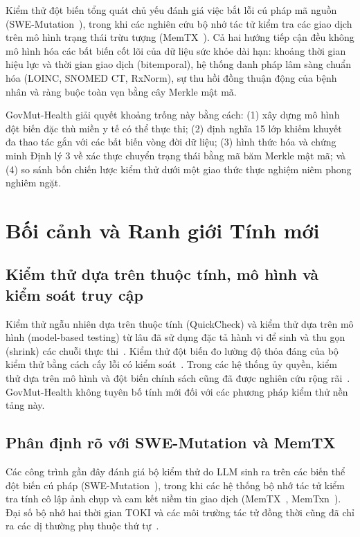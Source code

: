 \documentclass[11pt]{article}
\begin{document}
Kiểm thử đột biến tổng quát chủ yếu đánh giá việc bắt lỗi cú pháp mã nguồn (SWE-Mutation~\cite{swemutation}), trong khi các nghiên cứu bộ nhớ tác tử kiểm tra các giao dịch trên mô hình trạng thái trừu tượng (MemTX~\cite{memtx}). Cả hai hướng tiếp cận đều không mô hình hóa các bất biến cốt lõi của dữ liệu sức khỏe dài hạn: khoảng thời gian hiệu lực và thời gian giao dịch (bitemporal), hệ thống danh pháp lâm sàng chuẩn hóa (LOINC, SNOMED CT, RxNorm), sự thu hồi đồng thuận động của bệnh nhân và ràng buộc toàn vẹn bằng cây Merkle mật mã.

GovMut-Health giải quyết khoảng trống này bằng cách: (1) xây dựng mô hình đột biến đặc thù miền y tế có thể thực thi; (2) định nghĩa 15 lớp khiếm khuyết đa thao tác gắn với các bất biến vòng đời dữ liệu; (3) hình thức hóa và chứng minh Định lý 3 về xác thực chuyển trạng thái bằng mã băm Merkle mật mã; và (4) so sánh bốn chiến lược kiểm thử dưới một giao thức thực nghiệm niêm phong nghiêm ngặt.

\section{Bối cảnh và Ranh giới Tính mới}
\subsection{Kiểm thử dựa trên thuộc tính, mô hình và kiểm soát truy cập}
Kiểm thử ngẫu nhiên dựa trên thuộc tính (QuickCheck) và kiểm thử dựa trên mô hình (model-based testing) từ lâu đã sử dụng đặc tả hành vi để sinh và thu gọn (shrink) các chuỗi thực thi~\cite{quickcheck,utting}. Kiểm thử đột biến đo lường độ thỏa đáng của bộ kiểm thử bằng cách cấy lỗi có kiểm soát~\cite{jia}. Trong các hệ thống ủy quyền, kiểm thử dựa trên mô hình và đột biến chính sách cũng đã được nghiên cứu rộng rãi~\cite{pretschner2008,xu2012,nist800192}. GovMut-Health không tuyên bố tính mới đối với các phương pháp kiểm thử nền tảng này.

\subsection{Phân định rõ với SWE-Mutation và MemTX}
Các công trình gần đây đánh giá bộ kiểm thử do LLM sinh ra trên các biến thể đột biến cú pháp (SWE-Mutation~\cite{swemutation}), trong khi các hệ thống bộ nhớ tác tử kiểm tra tính cô lập ảnh chụp và cam kết niềm tin giao dịch (MemTX~\cite{memtx}, MemTxn~\cite{memtxn}). Đại số bộ nhớ hai thời gian TOKI và các môi trường tác tử đồng thời cũng đã chỉ ra các dị thường phụ thuộc thứ tự~\cite{toki,verifiedconcurrency}.
\end{document}
